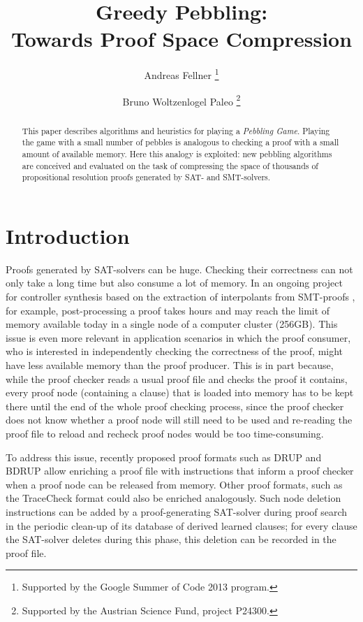 \documentclass{llncs}
\title{Greedy Pebbling: \\ 
Towards Proof Space Compression}
\author{
  Andreas Fellner 
  \thanks{Supported by the Google Summer of Code 2013 program.}
  \and 
  Bruno Woltzenlogel Paleo 
  \thanks{Supported by the Austrian Science Fund, project P24300.}
}
\institute{
  \email{fellner.a@gmail.com} \ \ \ \email{bruno@logic.at} \\
  Theory and Logic Group \\
  Institute for Computer Languages \\
  Vienna University of Technology
}
\begin{document}
\maketitle

\begin{abstract}
This paper describes algorithms and heuristics for playing a \emph{Pebbling Game}. Playing the game with a small number of pebbles is analogous to checking a proof with a small amount of available memory. Here this analogy is exploited: new pebbling algorithms are conceived and evaluated on the task of compressing the space of thousands of propositional resolution proofs generated by SAT- and SMT-solvers.
\end{abstract}

\setcounter{footnote}{0}


\section{Introduction}

Proofs generated by SAT-solvers can be huge. 
Checking their correctness can not only take a long time but also consume a lot of memory. 
In an ongoing project for controller synthesis based on the extraction of interpolants from SMT-proofs \cite{Hofferek}, 
for example, post-processing a proof takes hours and may reach the limit of memory available today in a single node of a computer cluster (256GB). This issue is even more relevant in application scenarios in which the proof consumer, who is interested in independently checking the correctness of the proof, might have less available memory than the proof producer.
This is in part because, while the proof checker reads a usual proof file and checks the proof it contains, 
every proof node (containing a clause) that is loaded into memory has to be kept there until the end of the whole proof checking process, 
since the proof checker does not know whether a proof node will still need to be used and re-reading the proof file to reload and recheck proof nodes would be too time-consuming. 

To address this issue, recently proposed proof formats such as DRUP \cite{drup} and BDRUP \cite{bdrup} allow enriching a proof file with instructions that inform a proof checker when a proof node can be released from memory. Other proof formats, such as the TraceCheck format \cite{tracecheck} could also be enriched analogously. Such node deletion instructions can be added by a proof-generating SAT-solver during proof search in the periodic clean-up of its database of derived learned clauses; for every clause the SAT-solver deletes during this phase, this deletion can be recorded in the proof file. 
\end{document}
